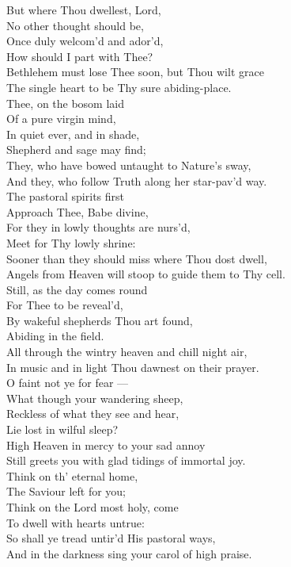   But where Thou dwellest, Lord, \\
 No other thought should be, \\
 Once duly welcom’d and ador’d, \\
 How should I part with Thee? \\
 Bethlehem must lose Thee soon, but Thou wilt grace \\
 The single heart to be Thy sure abiding-place. \\
  Thee, on the bosom laid \\
 Of a pure virgin mind, \\
 In quiet ever, and in shade, \\
 Shepherd and sage may find; \\
 They, who have bowed untaught to Nature’s sway, \\
 And they, who follow Truth along her star-pav’d way. \\
  The pastoral spirits first \\
 Approach Thee, Babe divine, \\
 For they in lowly thoughts are nurs’d, \\
 Meet for Thy lowly shrine: \\
 Sooner than they should miss where Thou dost dwell, \\
 Angels from Heaven will stoop to guide them to Thy cell. \\
  Still, as the day comes round \\
 For Thee to be reveal’d, \\
 By wakeful shepherds Thou art found, \\
 Abiding in the field. \\
 All through the wintry heaven and chill night air, \\
 In music and in light Thou dawnest on their prayer. \\
  O faint not ye for fear — \\
 What though your wandering sheep, \\
 Reckless of what they see and hear, \\
 Lie lost in wilful sleep? \\
 High Heaven in mercy to your sad annoy \\
 Still greets you with glad tidings of immortal joy. \\
  Think on th’ eternal home, \\
 The Saviour left for you; \\
 Think on the Lord most holy, come \\
 To dwell with hearts untrue: \\
 So shall ye tread untir’d His pastoral ways, \\
 And in the darkness sing your carol of high praise.\\

